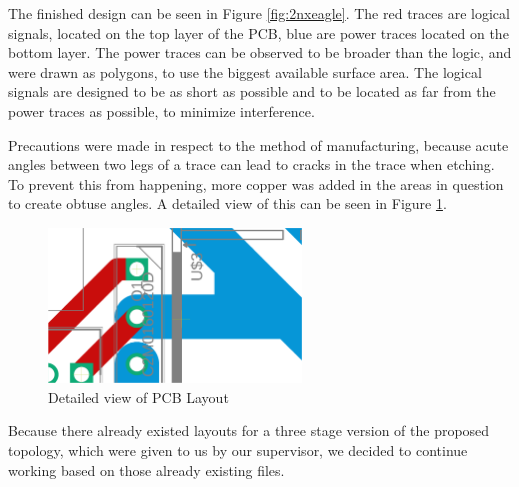 The finished design can be seen in Figure \ref{fig:2nxeagle}.
The red traces are logical signals,
located on the top layer of the PCB,
blue are power traces located on the bottom layer.
The power traces can be observed to be broader than the logic,
and were drawn as polygons,
to use the biggest available surface area.
The logical signals are designed to be as short as possible
and to be located as far from the power traces as possible,
to minimize interference.

Precautions were made in respect to the method of manufacturing,
because acute angles between two legs of a trace can lead to cracks in the trace when etching.
To prevent this from happening,
more copper was added in the areas in question to create obtuse angles.
A detailed view of this can be seen in Figure \ref{fig:2nxeagledetail}.
\begin{figure}[H]
	\begin{center}
	\includegraphics[width=0.6\textwidth]{figures/05cPCBdesign/2NX_interleaved_boost_converter_EAGLE_BY_DANIEL_DETAIL.pdf}
	\end{center}
	\caption{Detailed view of PCB Layout}
	\label{fig:2nxeagledetail}
\end{figure}

Because there already existed layouts for a three stage version of the proposed topology,
which were given to us by our supervisor,
we decided to continue working based on those already existing files.
